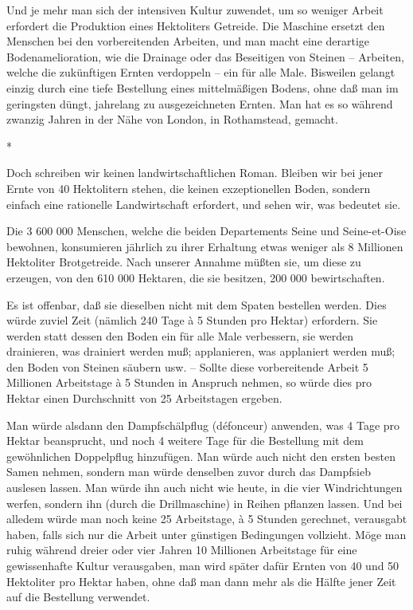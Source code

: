 \documentclass{scrbook}
\begin{document}
Und je mehr man sich der intensiven Kultur zuwendet, um so weniger Arbeit erfordert die Produktion eines Hektoliters Getreide. Die Maschine ersetzt den Menschen bei den vorbereitenden Arbeiten, und man macht eine derartige Bodenamelioration, wie die Drainage oder das Beseitigen von Steinen – Arbeiten, welche die zukünftigen Ernten verdoppeln – ein für alle Male. Bisweilen gelangt einzig durch eine tiefe Bestellung eines mittelmäßigen Bodens, ohne daß man im geringsten düngt, jahrelang zu ausgezeichneten Ernten. Man hat es so während zwanzig Jahren in der Nähe von London, in Rothamstead, gemacht.

\begin{center}*\end{center}

Doch schreiben wir keinen landwirtschaftlichen Roman. Bleiben wir bei jener Ernte von 40 Hektolitern stehen, die keinen exzeptionellen Boden, sondern einfach eine rationelle Landwirtschaft erfordert, und sehen wir, was bedeutet sie.

Die 3 600 000 Menschen, welche die beiden Departements Seine und Seine-et-Oise bewohnen, konsumieren jährlich zu ihrer Erhaltung etwas weniger als 8 Millionen Hektoliter Brotgetreide. Nach unserer Annahme müßten sie, um diese zu erzeugen, von den 610 000 Hektaren, die sie besitzen, 200 000 bewirtschaften.

Es ist offenbar, daß sie dieselben nicht mit dem Spaten bestellen werden. Dies würde zuviel Zeit (nämlich 240 Tage à 5 Stunden pro Hektar) erfordern. Sie werden statt dessen den Boden ein für alle Male verbessern, sie werden drainieren, was drainiert werden muß; applanieren, was applaniert werden muß; den Boden von Steinen säubern usw. – Sollte diese vorbereitende Arbeit 5 Millionen Arbeitstage à 5 Stunden in Anspruch nehmen, so würde dies pro Hektar einen Durchschnitt von 25 Arbeitstagen ergeben.

Man würde alsdann den Dampfschälpflug (défonceur) anwenden, was 4 Tage pro Hektar beansprucht, und noch 4 weitere Tage für die Bestellung mit dem gewöhnlichen Doppelpflug hinzufügen. Man würde auch nicht den ersten besten Samen nehmen, sondern man würde denselben zuvor durch das Dampfsieb auslesen lassen. Man würde ihn auch nicht wie heute, in die vier Windrichtungen werfen, sondern ihn (durch die Drillmaschine) in Reihen pflanzen lassen. Und bei alledem würde man noch keine 25 Arbeitstage, à 5 Stunden gerechnet, verausgabt haben, falls sich nur die Arbeit unter günstigen Bedingungen vollzieht. Möge man ruhig während dreier oder vier Jahren 10 Millionen Arbeitstage für eine gewissenhafte Kultur verausgaben, man wird später dafür Ernten von 40 und 50 Hektoliter pro Hektar haben, ohne daß man dann mehr als die Hälfte jener Zeit auf die Bestellung verwendet.
\end{document}
